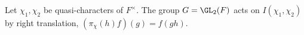 Let $\chi_1,\chi_2$ be quasi-characters of $F^\times$. The group $G=\GL_2(F)$ acts on $I(\chi_1,\chi_2)$ by right translation, $(\pi_\chi(h)f)(g)=f(gh)$.
